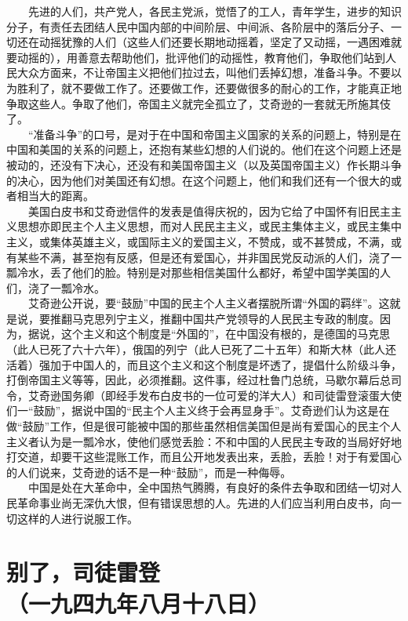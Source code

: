 \documentclass[cn,11pt,chinese]{elegantbook}
\def\myformat#1{\hfil\hfil #1}
\begin{document}
　　先进的人们，共产党人，各民主党派，觉悟了的工人，青年学生，进步的知识分子，有责任去团结人民中国内部的中间阶层、中间派、各阶层中的落后分子、一切还在动摇犹豫的人们（这些人们还要长期地动摇着，坚定了又动摇，一遇困难就要动摇的），用善意去帮助他们，批评他们的动摇性，教育他们，争取他们站到人民大众方面来，不让帝国主义把他们拉过去，叫他们丢掉幻想，准备斗争。不要以为胜利了，就不要做工作了。还要做工作，还要做很多的耐心的工作，才能真正地争取这些人。争取了他们，帝国主义就完全孤立了，艾奇逊的一套就无所施其伎了。\\
　　“准备斗争”的口号，是对于在中国和帝国主义国家的关系的问题上，特别是在中国和美国的关系的问题上，还抱有某些幻想的人们说的。他们在这个问题上还是被动的，还没有下决心，还没有和美国帝国主义（以及英国帝国主义）作长期斗争的决心，因为他们对美国还有幻想。在这个问题上，他们和我们还有一个很大的或者相当大的距离。\\
　　美国白皮书和艾奇逊信件的发表是值得庆祝的，因为它给了中国怀有旧民主主义思想亦即民主个人主义思想，而对人民民主主义，或民主集体主义，或民主集中主义，或集体英雄主义，或国际主义的爱国主义，不赞成，或不甚赞成，不满，或有某些不满，甚至抱有反感，但是还有爱国心，并非国民党反动派的人们，浇了一瓢冷水，丢了他们的脸。特别是对那些相信美国什么都好，希望中国学美国的人们，浇了一瓢冷水。\\
　　艾奇逊公开说，要“鼓励”中国的民主个人主义者摆脱所谓“外国的羁绊”。这就是说，要推翻马克思列宁主义，推翻中国共产党领导的人民民主专政的制度。因为，据说，这个主义和这个制度是“外国的”，在中国没有根的，是德国的马克思（此人已死了六十六年），俄国的列宁（此人已死了二十五年）和斯大林（此人还活着）强加于中国人的，而且这个主义和这个制度是坏透了，提倡什么阶级斗争，打倒帝国主义等等，因此，必须推翻。这件事，经过杜鲁门总统，马歇尔幕后总司令，艾奇逊国务卿（即经手发布白皮书的一位可爱的洋大人）和司徒雷登滚蛋大使们一“鼓励”，据说中国的“民主个人主义终于会再显身手”。艾奇逊们认为这是在做“鼓励”工作，但是很可能被中国的那些虽然相信美国但是尚有爱国心的民主个人主义者认为是一瓢冷水，使他们感觉丢脸：不和中国的人民民主专政的当局好好地打交道，却要干这些混账工作，而且公开地发表出来，丢脸，丢脸！对于有爱国心的人们说来，艾奇逊的话不是一种“鼓励”，而是一种侮辱。\\
　　中国是处在大革命中，全中国热气腾腾，有良好的条件去争取和团结一切对人民革命事业尚无深仇大恨，但有错误思想的人。先进的人们应当利用白皮书，向一切这样的人进行说服工作。\\
\newpage\section*{\myformat{别了，司徒雷登}\\\myformat{（一九四九年八月十八日）}}
\end{document}
